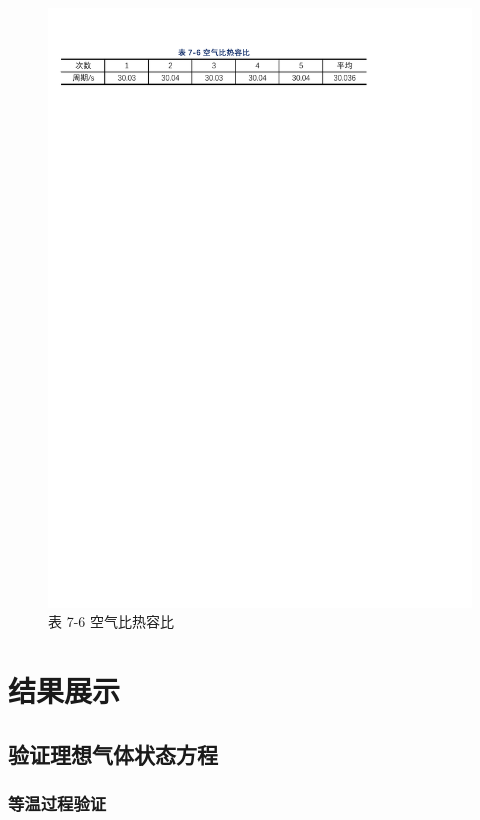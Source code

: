 \documentclass[12pt]{article}
\begin{document}
\begin{figure}[H] %
    \centering
    \includegraphics[width=\textwidth]{./figures/T7-6.pdf} 
    \caption{表 7-6 空气比热容比}
    \label{fig:table_data6}
\end{figure}

\section{\normalfont 结果展示}

\subsection{\normalfont 验证理想气体状态方程}

\subsubsection{\normalfont 等温过程验证}
\end{document}
